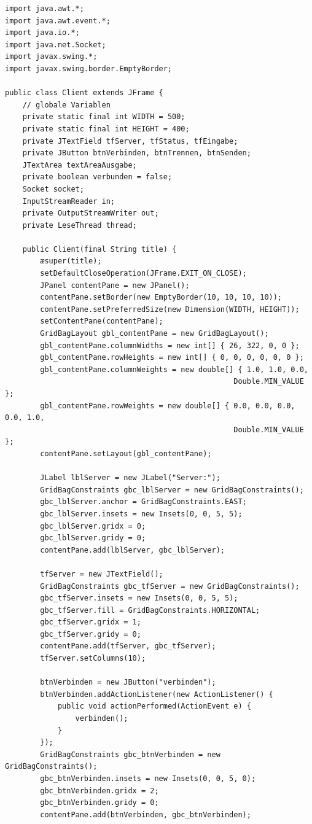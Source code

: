 \begin{lstlisting}
import java.awt.*;
import java.awt.event.*;
import java.io.*;
import java.net.Socket;
import javax.swing.*;
import javax.swing.border.EmptyBorder;

public class Client extends JFrame {
    // globale Variablen
    private static final int WIDTH = 500;
    private static final int HEIGHT = 400;
    private JTextField tfServer, tfStatus, tfEingabe;
    private JButton btnVerbinden, btnTrennen, btnSenden;
    JTextArea textAreaAusgabe;
    private boolean verbunden = false;
    Socket socket;
    InputStreamReader in;
    private OutputStreamWriter out;
    private LeseThread thread;

    public Client(final String title) {
        æsuper(title);
        setDefaultCloseOperation(JFrame.EXIT_ON_CLOSE);
        JPanel contentPane = new JPanel();
        contentPane.setBorder(new EmptyBorder(10, 10, 10, 10));
        contentPane.setPreferredSize(new Dimension(WIDTH, HEIGHT));
        setContentPane(contentPane);
        GridBagLayout gbl_contentPane = new GridBagLayout();
        gbl_contentPane.columnWidths = new int[] { 26, 322, 0, 0 };
        gbl_contentPane.rowHeights = new int[] { 0, 0, 0, 0, 0, 0 };
        gbl_contentPane.columnWeights = new double[] { 1.0, 1.0, 0.0, 
        											Double.MIN_VALUE };
        gbl_contentPane.rowWeights = new double[] { 0.0, 0.0, 0.0, 0.0, 1.0,  
                                                    Double.MIN_VALUE };
        contentPane.setLayout(gbl_contentPane);

        JLabel lblServer = new JLabel("Server:");
        GridBagConstraints gbc_lblServer = new GridBagConstraints();
        gbc_lblServer.anchor = GridBagConstraints.EAST;
        gbc_lblServer.insets = new Insets(0, 0, 5, 5);
        gbc_lblServer.gridx = 0;
        gbc_lblServer.gridy = 0;
        contentPane.add(lblServer, gbc_lblServer);

        tfServer = new JTextField();
        GridBagConstraints gbc_tfServer = new GridBagConstraints();
        gbc_tfServer.insets = new Insets(0, 0, 5, 5);
        gbc_tfServer.fill = GridBagConstraints.HORIZONTAL;
        gbc_tfServer.gridx = 1;
        gbc_tfServer.gridy = 0;
        contentPane.add(tfServer, gbc_tfServer);
        tfServer.setColumns(10);

        btnVerbinden = new JButton("verbinden");
        btnVerbinden.addActionListener(new ActionListener() {
            public void actionPerformed(ActionEvent e) {
                verbinden();
            }
        });
        GridBagConstraints gbc_btnVerbinden = new GridBagConstraints();
        gbc_btnVerbinden.insets = new Insets(0, 0, 5, 0);
        gbc_btnVerbinden.gridx = 2;
        gbc_btnVerbinden.gridy = 0;
        contentPane.add(btnVerbinden, gbc_btnVerbinden);


\end{lstlisting}

